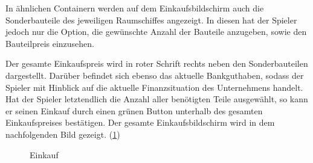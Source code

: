 In ähnlichen Containern werden auf dem Einkaufsbildschirm auch die Sonderbauteile des jeweiligen Raumschiffes angezeigt. In diesen hat der Spieler jedoch nur die Option, die gewünschte Anzahl der Bauteile anzugeben, sowie den Bauteilpreis einzusehen.
 
Der gesamte Einkaufspreis wird in roter Schrift rechts neben den Sonderbauteilen dargestellt. Darüber befindet sich ebenso das aktuelle Bankguthaben, sodass der Spieler mit Hinblick auf die aktuelle Finanzsituation des Unternehmens handelt. Hat der Spieler letztendlich die Anzahl aller benötigten Teile ausgewählt, so kann er seinen Einkauf durch einen grünen Button unterhalb des gesamten Einkaufspreises bestätigen. Der gesamte Einkaufsbildschirm wird in dem nachfolgenden Bild gezeigt. (\ref{img:ui-einkauf})

\begin{figure}[htb]
  \centering
  \caption{Einkauf}
  \label{img:ui-einkauf}
\end{figure}

\autorende{}